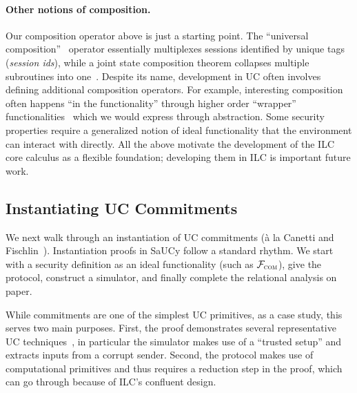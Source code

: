 \paragraph{Other notions of composition.}
Our composition operator above is just a starting point.
The ``universal composition''~\cite{canetti2001universally} operator essentially multiplexes sessions identified by unique tags (\emph{session ids}), while a joint state composition theorem collapses multiple subroutines into one~\cite{canetti2003universal}.
Despite its name, development in UC often involves defining additional composition operators. 
For example, interesting composition often happens ``in the functionality''
through higher order ``wrapper''
functionalities~\cite{kosba2016hawk,katz2007universally} which we would express
through abstraction. Some security properties require a generalized notion of
ideal functionality that the environment can interact with directly. All the
above motivate the development of the ILC core calculus as a flexible
foundation; developing them in ILC is important future work.


\subsection{Instantiating UC Commitments}
\label{subsec:example}
We next walk through an instantiation of UC commitments (\`{a} la Canetti and
Fischlin~\cite{canetti2001commitments}).
Instantiation proofs in SaUCy follow a
standard rhythm. We start with a security definition as an ideal functionality
(such as $\mathcal{{F}}_{\textsc{com}}$), give the protocol, construct a simulator, and
finally complete the relational analysis on paper.

While commitments are one of the simplest UC primitives, as a case study, this
serves two main purposes.  First, the proof demonstrates several representative
UC techniques~\cite{lindell2017simulate}, in particular the simulator makes use
of a ``trusted setup'' and extracts inputs from a corrupt sender.
Second, the protocol makes use of computational primitives and thus requires a
reduction step in the proof, which can go through because of ILC's confluent
design.



